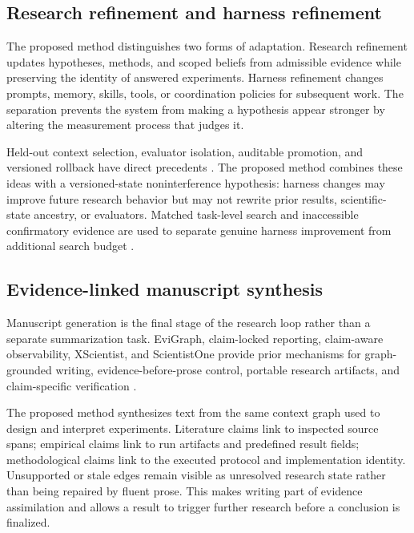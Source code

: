 \documentclass[11pt,a4paper]{article}
\begin{document}
\subsection{Research refinement and harness refinement}

The proposed method distinguishes two forms of adaptation.  Research refinement updates
hypotheses, methods, and scoped beliefs from admissible evidence while preserving
the identity of answered experiments.  Harness refinement changes prompts,
memory, skills, tools, or coordination policies for subsequent work.  The
separation prevents the system from making a hypothesis appear stronger by
altering the measurement process that judges it.

Held-out context selection, evaluator isolation, auditable promotion, and
versioned rollback have direct precedents \citep{rsea2026,evobench2026,
regimes2026,autogenesis2026}.  The proposed method combines these ideas with a versioned-state
noninterference hypothesis: harness changes may improve future research behavior
but may not rewrite prior results, scientific-state ancestry, or evaluators.
Matched task-level search and inaccessible confirmatory evidence are used to
separate genuine harness improvement from additional search budget
\citep{rethinkingharness2026,harnessopt2026}.

\subsection{Evidence-linked manuscript synthesis}

Manuscript generation is the final stage of the research loop rather than a
separate summarization task.  EviGraph, claim-locked reporting, claim-aware
observability, XScientist, and ScientistOne provide prior mechanisms for
graph-grounded writing, evidence-before-prose control, portable research
artifacts, and claim-specific verification \citep{evigraph2026,
claimlocked2026,claimobservability2026,xscientist2026,scientistone2026}.

The proposed method synthesizes text from the same context graph used to design and interpret
experiments.  Literature claims link to inspected source spans; empirical claims
link to run artifacts and predefined result fields; methodological claims link
to the executed protocol and implementation identity.  Unsupported or stale
edges remain visible as unresolved research state rather than being repaired by
fluent prose.  This makes writing part of evidence assimilation and allows a
result to trigger further research before a conclusion is finalized.
\end{document}
